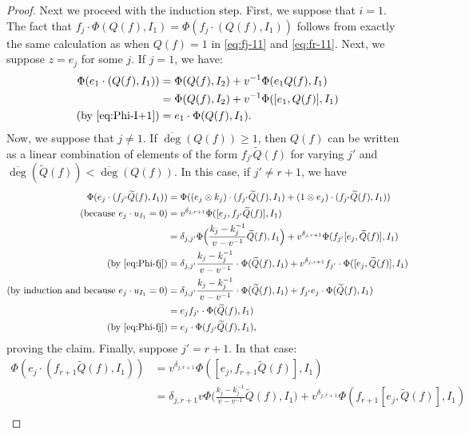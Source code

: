 \documentclass{amsart}
\numberwithin{equation}{section}
\theoremstyle{theorem}
\theoremstyle{definition}
\newcommand{\ol}{\overline}
\begin{document}
\begin{proof}
Next we proceed with the induction step. First, we suppose that $i=1$. The fact that $f_j\cdot\Phi(Q(f),I_1)=\Phi(f_j\cdot(Q(f),I_1))$ follows from exactly the same calculation as when $Q(f)=1$ in \eqref{eq:fj-11} and \eqref{eq:fr-11}. Next, we suppose $z=e_j$ for some $j$. If $j=1$, we have:
\begin{align*}\Phi(e_1\cdot (Q(f),I_1)) & = \Phi(Q(f),I_2) + v^{-1}\Phi(e_1Q(f),I_1) \\
&= \Phi(Q(f),I_2) + v^{-1}\Phi([e_1,Q(f)],I_1) \\
\text{(by \eqref{eq:Phi-I+1})} &= e_1\cdot \Phi(Q(f),I_1).\end{align*}
Now, we suppose that $j\neq 1$. If $\ol\deg(Q(f))\geq 1$, then $Q(f)$ can be written as a linear combination of elements of the form $f_{j'}\widetilde Q(f)$ for varying $j'$ and $\ol\deg(\widetilde Q(f))< \ol\deg(Q(f))$. In this case, if $j'\neq r+1$, we have
\begin{align*}
\Phi(e_j\cdot(f_{j'}\widetilde Q(f), I_1))&=\Phi((e_j\otimes k_j)\cdot(f_{j'}\widetilde Q(f),I_1)+(1\otimes e_j)\cdot(f_{j'}\widetilde Q(f),I_1))\\
\text{(because $e_j\cdot u_{I_1}=0$)} &=v^{\delta_{j,r+1}}\Phi([e_j,f_{j'}\widetilde Q(f)], I_1)\\
&=\delta_{j,j'}\Phi\Big(\frac{k_{j}-k_{j}^{-1}}{v-v^{-1}}\widetilde Q(f),I_1\Big) + v^{\delta_{j,r+1}}\Phi(f_{j'}[e_j,\widetilde{Q}(f)],I_1)\\
\text{(by \eqref{eq:Phi-fj})}&=\delta_{j,j'}\frac{k_{j}-k_{j}^{-1}}{v-v^{-1}}\cdot\Phi(\widetilde Q(f),I_1) + v^{\delta_{j,r+1}}f_{j
'}\cdot \Phi([e_j,\widetilde{Q}(f)],I_1)\\
\text{(by induction and because $e_j\cdot u_{I_1}=0$)}&=\delta_{j,j'}\frac{k_{j}-k_{j}^{-1}}{v-v^{-1}}\cdot\Phi(\widetilde Q(f),I_1) + f_{j'}e_j\cdot\Phi(\widetilde{Q}(f),I_1)\\
&=e_jf_{j'}\cdot \Phi(\widetilde{Q}(f),I_1)\\
\text{(by \eqref{eq:Phi-fj})}&=e_j\cdot \Phi(f_{j'}\widetilde{Q}(f),I_1),
\end{align*}
proving the claim. Finally, suppose $j'=r+1$. In that case:
\begin{align*}
\Phi(e_j\cdot(f_{r+1}\widetilde Q(f), I_1))&=v^{\delta_{j,r+1}}\Phi([e_j,f_{r+1}\widetilde Q(f)], I_1)\\
&=\delta_{j,r+1}v\Phi\Big(\frac{k_j-k_j^{-1}}{v-v^{-1}}\widetilde Q(f),I_1\Big) + v^{\delta_{j,r+1}}\Phi(f_{r+1}[e_j,\widetilde{Q}(f)],I_1)\\

\end{align*}
\end{proof}
\end{document}
